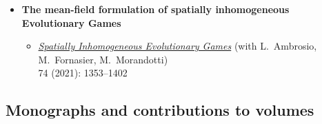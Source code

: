 \documentclass[reqno,11pt]{article}
\newenvironment{smallquote}{\list{}{\leftmargin=0.15in\rightmargin=0.15in\topsep=-4pt}\item[]}{\endlist}
\theoremstyle{plain}
\begin{document}
\begin{itemize}[wide,
  topsep=-0.5\parsep,
  itemsep=-4pt,
  leftmargin=12pt,
  ]
\begin{itemize}[
  topsep=-2\parsep,
  itemsep=-2pt,
  leftmargin=12pt,
  itemindent=-12pt
  ]
\item%
\href{https://mathscinet.ams.org/leavingmsn?url=https://doi.org/10.1007/s00205-017-1165-5}{\em
  Viscous corrections of the time incremental minimization scheme and
  visco-energetic solutions to rate-independent evolution problems.}
(with L.~Minotti) Arch. Ration. Mech. Anal. 227 (2018), no. 2,
477-543.

\end{itemize}

\item \textbf{The mean-field formulation of spatially inhomogeneous Evolutionary
  Games}

\begin{itemize}[
  topsep=-2\parsep,
  itemsep=-2pt,
  leftmargin=12pt,
  itemindent=-12pt
  ]
\renewcommand{\labelitemii}{}
\item%
  \href{https://doi.org/10.1002/cpa.21995}{\emph{Spatially Inhomogeneous Evolutionary Games}}
  (with L.~Ambrosio, M.~Fornasier, M.~Morandotti)\\
   74 (2021): 1353--1402
\end{itemize}
\end{itemize}




\subsection*{Monographs and contributions to volumes}
\end{document}
